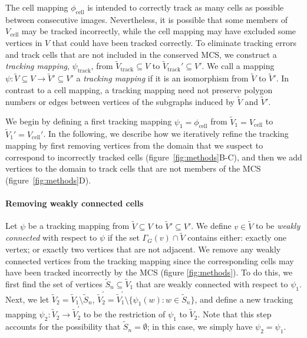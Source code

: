 \documentclass[a4paper,11pt]{article}
\begin{document}
The cell mapping $\phi_{\mathrm{cell}}$ is intended to correctly track as many cells as possible between consecutive images. 
Nevertheless, it is possible that some members of $V_{\mathrm{cell}}$ may be tracked incorrectly, while the cell mapping may have excluded some vertices in $V$ that could have been tracked correctly. 
To eliminate tracking errors and track cells that are not included in the conserved MCS, we construct a \textit{tracking mapping}, $\psi_{\mathrm{track}}$, from $\tilde{V}_{\mathrm{track}} \subseteq V$ to $\tilde{V}_{\mathrm{track}}' \subseteq V'$. 
We call a mapping $\psi: \tilde{V} \subseteq V \rightarrow \tilde{V}' \subseteq V'$ a \textit{tracking mapping} if it is an isomorphism from $\tilde{V}$ to $\tilde{V}'$.
In contrast to a cell mapping, a tracking mapping need not preserve polygon numbers or edges between vertices of the subgraphs induced by $\tilde{V}$ and $\tilde{V}'$. 

We begin by defining a first tracking mapping $\psi_{1} = \phi_\mathrm{cell}$ from $\tilde{V}_{1} = V_{\mathrm{cell}}$ to $\tilde{V}_{1}' = V_{\mathrm{cell}}'$. 
In the following, we describe how we iteratively refine the tracking mapping by first removing vertices from the domain that we suspect to correspond to incorrectly tracked cells (figure~\ref{fig:methods}B-C), and then we add vertices to the domain to track cells that are not members of the MCS (figure~\ref{fig:methods}D). 


\paragraph{Removing weakly connected cells}

Let $\psi$ be a tracking mapping from $\tilde{V} \subseteq V$ to $\tilde{V}' \subseteq V'$. We define $v \in \tilde{V}$ to be \textit{weakly connected} with respect to $\psi$ if the set $\Gamma_{G}(v) \cap \tilde{V}$ contains either: exactly one vertex; or exactly two vertices that are not adjacent.
We remove any weakly connected vertices from the tracking mapping since the corresponding cells may have been tracked incorrectly by the MCS (figure \ref{fig:methods}). 
To do this, we first find the set of vertices $\tilde{S}_{n} \subseteq \tilde{V}_{1}$ that are weakly connected with respect to $\psi_{1}$. 
Next, we let $\tilde{V}_{2} = \tilde{V}_{1} \setminus \tilde{S}_{n}$, $\tilde{V}_{2}^{'} = \tilde{V}_{1}^{'} \setminus \{ \psi_{1}(w) : w \in \tilde{S}_{n} \}$, and define a new tracking mapping $\psi_{2} : \tilde{V}_{2} \rightarrow \tilde{V}_{2}^{'}$ to be the restriction of $\psi_{1}$ to $\tilde{V}_{2}$. 
Note that this step accounts for the possibility that $\tilde{S}_{n} = \emptyset$; in this case, we simply have $\psi_{2} = \psi_{1}$.
\end{document}
